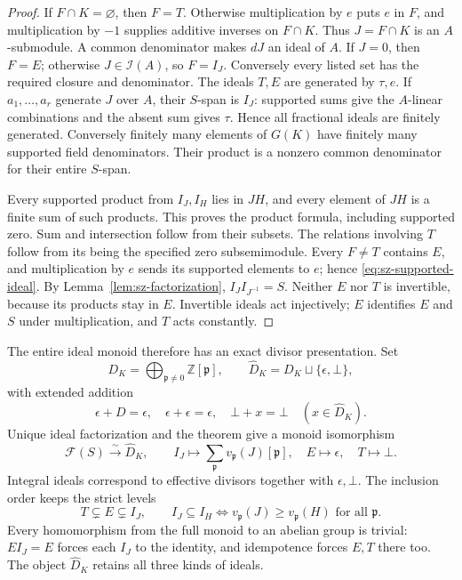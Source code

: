 \documentclass[11pt,a4paper]{article}
\theoremstyle{definition}\newtheorem{definition}[theorem]{Definition}
\begin{document}
\begin{proof}
If \(F\cap K=\varnothing\), then \(F=T\). Otherwise multiplication
by \(e\) puts \(e\) in \(F\), and multiplication by \(-1\) supplies
additive inverses on \(F\cap K\). Thus \(J=F\cap K\) is an \(A\)-submodule.
A common denominator makes \(dJ\) an ideal of \(A\). If \(J=0\),
then \(F=E\); otherwise \(J\in\mathcal I(A)\), so \(F=I_J\).
Conversely every listed set has the required closure and denominator.
The ideals \(T,E\) are generated by \(\tau,e\). If \(a_1,\ldots,a_r\)
generate \(J\) over \(A\), their \(S\)-span is \(I_J\):
supported sums give the \(A\)-linear combinations and the absent
sum gives \(\tau\). Hence all fractional ideals are finitely generated.
Conversely finitely many elements of \(G(K)\) have finitely many
supported field denominators. Their product is a nonzero common
denominator for their entire \(S\)-span.

Every supported product from \(I_J,I_H\) lies in \(JH\), and every
element of \(JH\) is a finite sum of such products. This proves the
product formula, including supported zero. Sum and intersection
follow from their subsets. The relations involving \(T\) follow
from its being the specified zero subsemimodule. Every \(F\ne T\)
contains \(E\), and multiplication by \(e\) sends its supported
elements to \(e\); hence \eqref{eq:sz-supported-ideal}.
By Lemma~\ref{lem:sz-factorization}, \(I_JI_{J^{-1}}=S\).
Neither \(E\) nor \(T\) is invertible, because its products stay in
\(E\). Invertible ideals act injectively; \(E\) identifies \(E\)
and \(S\) under multiplication, and \(T\) acts constantly.
\end{proof}

The entire ideal monoid therefore has an exact divisor presentation.
Set
\[
 D_K=\bigoplus_{\mathfrak p\ne0}\mathbb Z[\mathfrak p],
 \qquad \widehat D_K=D_K\sqcup\{\epsilon,\bot\},
\]
with extended addition
\[
 \epsilon+D=\epsilon,\quad \epsilon+\epsilon=\epsilon,\quad
 \bot+x=\bot\quad(x\in\widehat D_K).
\]
Unique ideal factorization and the theorem give a monoid isomorphism
\begin{equation}\label{eq:sz-full-divisor-monoid}
 \mathcal F(S)\xrightarrow{\sim}\widehat D_K,\qquad
 I_J\mapsto\sum_{\mathfrak p}v_{\mathfrak p}(J)[\mathfrak p],
 \quad E\mapsto\epsilon,\quad T\mapsto\bot .
\end{equation}
Integral ideals correspond to effective divisors together with
\(\epsilon,\bot\). The inclusion order keeps the strict levels
\[
 T\subsetneq E\subsetneq I_J,\qquad
 I_J\subseteq I_H\iff v_{\mathfrak p}(J)\ge v_{\mathfrak p}(H)
 \text{ for all }\mathfrak p.
\]
Every homomorphism from the full monoid to an abelian group is
trivial: \(EI_J=E\) forces each \(I_J\) to the identity, and
idempotence forces \(E,T\) there too. The object
\(\widehat D_K\) retains all three kinds of ideals.
\end{document}
